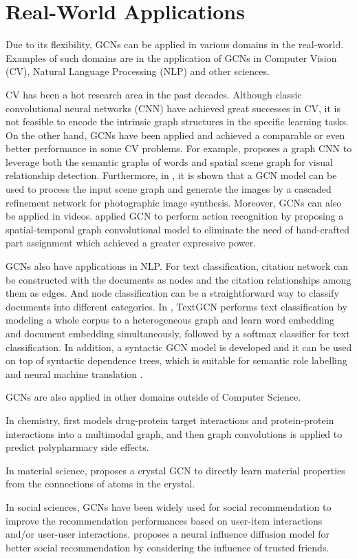 \section{Real-World Applications}
Due to its flexibility, GCNs can be applied in various domains in the real-world. Examples of such domains are in the application of GCNs in Computer Vision (CV), Natural Language Processing (NLP) and other sciences.

CV has been a hot research area in the past decades. Although classic convolutional neural networks (CNN) have achieved great successes in CV, it is not feasible to encode the intrinsic graph structures in the specific learning tasks. On the other hand, GCNs have been applied and achieved a comparable or even better performance in some CV problems. For example, \cite{cui2018context} proposes a graph CNN to leverage both the semantic graphs of words and spatial scene graph for visual relationship detection. Furthermore, in \cite{chen2017photographic}, it is shown that a GCN model can be used to process the input scene graph and generate the images by a cascaded refinement network for photographic image synthesis. Moreover, GCNs can also be applied in videos. \cite{yan2018spatial} applied GCN to perform action recognition by proposing a spatial-temporal graph convolutional model to eliminate the need of hand-crafted part assignment which achieved a greater expressive power.

GCNs also have applications in NLP. For text classification, citation network can be constructed with the documents as nodes and the citation relationships among them as edges. And node classification can be a straightforward way to classify documents into different categories. In \cite{yao2019graph}, TextGCN performs text classification by modeling a whole corpus to a heterogeneous graph and learn word embedding and document embedding simultaneously, followed by a softmax classifier for text classification. In addition, a syntactic GCN model is developed and it can be used on top of syntactic dependence trees, which is suitable for semantic role labelling \cite{marcheggiani2017encoding} and neural machine translation \cite{bastings2017graph}.

GCNs are also applied in other domains outside of Computer Science.

In chemistry, \cite{zitnik2018modeling} first models drug-protein target interactions and protein-protein interactions into a multimodal graph, and then graph convolutions is applied to predict polypharmacy side effects. 

In material science, \cite{xie2018crystal} proposes a crystal GCN to directly learn material properties from the connections of atoms in the crystal. 

In social sciences, GCNs have been widely used for social recommendation to improve the recommendation performances based on user-item interactions and/or user-user interactions. \cite{wu2019neural} proposes a neural influence diffusion model for better social recommendation by considering the influence of trusted friends.

